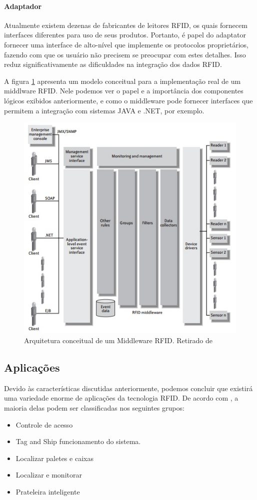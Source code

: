 	\paragraph{Adaptador} Atualmente existem dezenas de fabricantes de leitores RFID, os quais fornecem interfaces diferentes para uso de seus produtos. Portanto, é papel do adaptator fornecer uma interface de alto-nível que implemente os protocolos proprietários, fazendo com que os usuário não precisem se preocupar com estes detalhes. Isso reduz significativamente as dificuldades na integração dos dados RFID.
	
	A figura \ref{fig:midarc} apresenta um modelo conceitual para a implementação real de um middlware RFID. Nele podemos ver o papel e a importância dos componentes lógicos exibidos anteriormente, e como o middleware pode fornecer interfaces que permitem a integração com sistemas JAVA e .NET, por exemplo.
	
		\begin{figure}[h!]
			\centering
			\includegraphics[width=0.5\linewidth]{midarc}
			\caption{Arquitetura conceitual de um Middleware RFID. Retirado de \cite{rfidbook}}
			\label{fig:midarc}
		\end{figure}
	
	\subsection{Aplicações}
	Devido às características discutidas anteriormente, podemos concluir que existirá uma variedade enorme de aplicações da tecnologia RFID. De acordo com \cite{rfidbook}, a maioria delas podem ser classificadas nos seguintes grupos:
	\begin{itemize}
		\item Controle de acesso
		\item Tag and Ship funcionamento do sistema.
		\item Localizar paletes e caixas
		\item Localizar e monitorar
		\item Prateleira inteligente
	\end{itemize}
	
